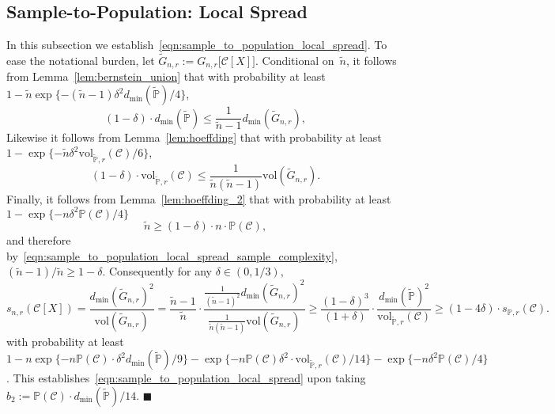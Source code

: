 \documentclass[twoside,11pt]{article}
\newcommand{\1}{\mathbf{1}}
\newcommand{\mc}[1]{\mathcal{#1}}
\newcommand{\Pbb}{\mathbb{P}}
\newcommand{\wt}[1]{\widetilde{#1}}
\newcommand{\vol}{\mathrm{vol}}
\newcommand{\qed}{\hfill $\blacksquare$}
\begin{document}
\subsection{Sample-to-Population: Local Spread}
\label{subsec:sample_to_population_local_spread}
In this subsection we establish~\eqref{eqn:sample_to_population_local_spread}. To ease the notational burden, let $\wt{G}_{n,r} := G_{n,r}\bigl[\mc{C}[X]\bigr]$. 
Conditional on~$\wt{n}$, it follows from Lemma~\ref{lem:bernstein_union} that with probability at least $1 - \wt{n}\exp\{-(\wt{n} - 1) \delta^2d_{\min}(\wt{\Pbb})/4\}$,
\begin{equation}
\label{pf:sample_to_population_local_spread_2}
(1 - \delta) \cdot d_{\min}(\wt{\Pbb}) \leq \frac{1}{\wt{n} - 1} d_{\min}(\wt{G}_{n,r}),
\end{equation}
Likewise it follows from Lemma~\ref{lem:hoeffding} that with probability at least $1 - \exp\{-\wt{n}\delta^2 \vol_{\wt{\Pbb},r}(\mc{C})/6\}$,
\begin{equation*}
(1 - \delta) \cdot \vol_{\wt{\Pbb},r}(\mc{C}) \leq \frac{1}{\wt{n}(\wt{n} - 1)} \vol(\wt{G}_{n,r}).
\end{equation*}
Finally, it follows from Lemma~\ref{lem:hoeffding_2} that with probability at least $1 - \exp\{-n\delta^2 \Pbb(\mc{C})/4\}$
\begin{equation}
\label{pf:sample_to_population_local_spread_1}
\wt{n} \geq (1 - \delta) \cdot n \cdot \Pbb(\mc{C}),
\end{equation}
and therefore by~\eqref{eqn:sample_to_population_local_spread_sample_complexity}, $(\wt{n} - 1)/\wt{n} \geq 1 - \delta$. Consequently for any $\delta \in (0,1/3)$,
\begin{equation*}
s_{n,r}(\mc{C}[X]) = \frac{d_{\min}(\wt{G}_{n,r})^2}{\vol(\wt{G}_{n,r})} = \frac{\wt{n} - 1}{\wt{n}} \cdot \frac{\frac{1}{(\wt{n} - 1)^2}d_{\min}(\wt{G}_{n,r})^2}{\frac{1}{\wt{n}(\wt{n} - 1)}\vol(\wt{G}_{n,r})} \geq \frac{(1 - \delta)^3}{(1 + \delta)} \cdot  \frac{d_{\min}(\wt{\Pbb})^2}{\vol_{\wt{\Pbb},r}(\mc{C})} \geq (1 - 4\delta) \cdot s_{\Pbb,r}(\mc{C}).
\end{equation*}
with probability at least $1 - n\exp\{-n\Pbb(\mc{C}) \cdot \delta^2d_{\min}(\wt{\Pbb})/9\} - \exp\{-n\Pbb(\mc{C})\delta^2 \cdot \vol_{\wt{\Pbb},r}(\mc{C})/14\} - \exp\{-n\delta^2 \Pbb(\mc{C})/4\}$. This establishes~\eqref{eqn:sample_to_population_local_spread} upon taking $b_2 := \Pbb(\mc{C}) \cdot d_{\min}(\wt{\Pbb})/14$. \qed

\end{document}
